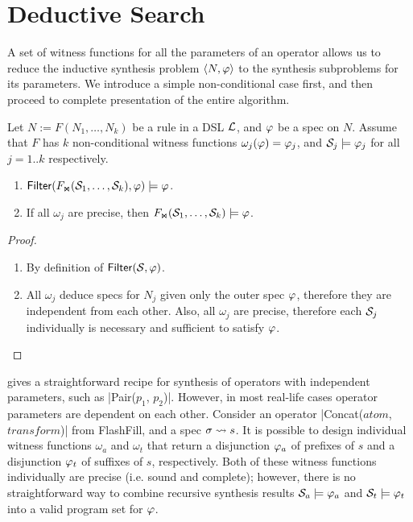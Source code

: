 \section{Deductive Search}
\label{sec:prose:algorithm}

A set of witness functions for all the parameters of an operator allows us to reduce the inductive synthesis problem
$\langle N, \varphi\rangle$ to the synthesis subproblems for its parameters.
We introduce a simple non-conditional case first, and then proceed to complete presentation of the entire algorithm.

\begin{theorem}
    Let $N := F(N_1, \dots, N_k)$ be a rule in a DSL $\mathcal{L}$, and $\varphi$ be a spec on $N$.
    Assume that $F$ has $k$ non-conditional witness functions $\omega_j(\varphi) = \varphi_j$,
    and $\mathcal{S}_j \models \varphi_j$ for all $j = 1..k$ respectively.
    \begin{enumerate}[nosep]
        \item $\mathsf{Filter}(F_{\text{\scriptsize\ensuremath{\Join}}}(\mathcal{S}_1, \dots, \mathcal{S}_k), \varphi) \models \varphi$.
        \item If all $\omega_j$ are precise, then $F_{\text{\scriptsize\ensuremath{\Join}}}(\mathcal{S}_1, \dots, \mathcal{S}_k) \models \varphi$.
    \end{enumerate}
    \label{thm:wf:noncond}
\end{theorem}
\begin{proof} \leavevmode
    \begin{enumerate}[nosep]
        \item By definition of $\mathsf{Filter}(\mathcal{S}, \varphi)$.
        \item All $\omega_j$ deduce specs for $N_j$ given only the outer spec $\varphi$, therefore they
            are independent from each other.
            Also, all $\omega_j$ are precise, therefore each $\mathcal{S}_j$ individually is necessary and sufficient to
            satisfy $\varphi$. \qedhere
    \end{enumerate}
\end{proof}

 gives a straightforward recipe for synthesis of operators with independent parameters, such as
\dslinline|Pair($p_1$, $p_2$)|.
However, in most real-life cases operator parameters are dependent on each other.
Consider an operator \dslinline|Concat($atom$, $transform$)| from FlashFill, and a spec $\sigma \rightsquigarrow s$.
It is possible to design individual witness functions $\omega_a$ and $\omega_t$ that return a disjunction $\varphi_a$ of
prefixes of $s$ and a disjunction $\varphi_t$ of suffixes of $s$, respectively.
Both of these witness functions individually are precise (i.e. sound and complete); however, there is no straightforward
way to combine recursive synthesis results $\mathcal{S}_a \models \varphi_a$ and $\mathcal{S}_t \models \varphi_t$ into a valid program
set for $\varphi$.

